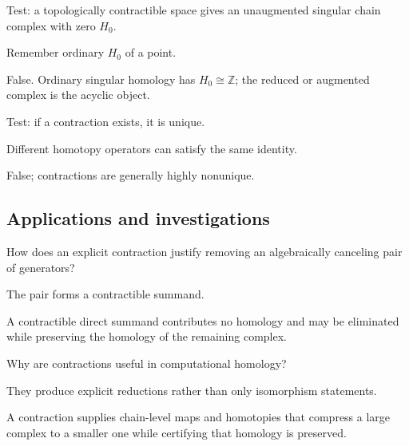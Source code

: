 \begin{exercise}\label{exr:viii23-ped-11}
Test: a topologically contractible space gives an unaugmented singular chain complex with zero $H_0$.
\end{exercise}
\begin{hint}
Remember ordinary $H_0$ of a point.
\end{hint}
\begin{solution}
False. Ordinary singular homology has $H_0\cong\mathbb Z$; the reduced or augmented complex is the acyclic object.
\end{solution}

\begin{exercise}\label{exr:viii23-ped-12}
Test: if a contraction exists, it is unique.
\end{exercise}
\begin{hint}
Different homotopy operators can satisfy the same identity.
\end{hint}
\begin{solution}
False; contractions are generally highly nonunique.
\end{solution}

\subsection*{Applications and investigations}

\begin{exercise}\label{exr:viii23-ped-13}
How does an explicit contraction justify removing an algebraically canceling pair of generators?
\end{exercise}
\begin{hint}
The pair forms a contractible summand.
\end{hint}
\begin{solution}
A contractible direct summand contributes no homology and may be eliminated while preserving the homology of the remaining complex.
\end{solution}

\begin{exercise}\label{exr:viii23-ped-14}
Why are contractions useful in computational homology?
\end{exercise}
\begin{hint}
They produce explicit reductions rather than only isomorphism statements.
\end{hint}
\begin{solution}
A contraction supplies chain-level maps and homotopies that compress a large complex to a smaller one while certifying that homology is preserved.
\end{solution}

